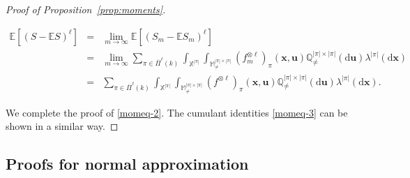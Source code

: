 \documentclass{article}
\theoremstyle{definition}
\numberwithin{equation}{section}
\theoremstyle{remark}
\newcommand{\E}{\mathbb{E}}
\begin{document}
\begin{proof}[Proof of Proposition~\ref{prop:moments}]
\begin{enumerate}
\begin{eqnarray*}
    \E\left[(S-\E S)^{\ell}\right]&=&\lim_{m\to\infty}\E\left[(S_m-\E S_m)^{\ell}\right]\\
    &=&\lim_{m\to\infty}\sum_{\pi\in\overline{\Pi}^\ell(k)}\int_{\mathbb{X}^{|\pi|}}\int_{\mathbb{M}^{|\pi|\times|\pi|}_{\ne}}(f_m^{\otimes\ell})_{\pi}(\bm{x},\bm{u})\mathbb{Q}^{|\pi|\times|\pi|}_{\ne}(\mathrm{d}\bm{u})\lambda^{|\pi|}(\mathrm{d}\bm{x})\\
    &=&\sum_{\pi\in\overline{\Pi}^\ell(k)}\int_{\mathbb{X}^{|\pi|}}\int_{\mathbb{M}^{|\pi|\times|\pi|}_{\ne}}(f^{\otimes\ell})_{\pi}(\bm{x},\bm{u})\mathbb{Q}^{|\pi|\times|\pi|}_{\ne}(\mathrm{d}\bm{u})\lambda^{|\pi|}(\mathrm{d}\bm{x}).
\end{eqnarray*}
\end{enumerate}
We complete the proof of \eqref{momeq-2}. The cumulant identities \eqref{momeq-3} can be shown in a similar way.   
\end{proof}
\subsection{Proofs for normal approximation} %
\end{document}
